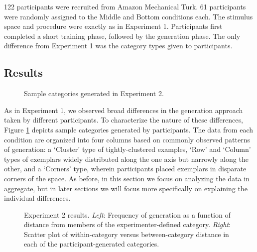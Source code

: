 \documentclass[12pt]{article}
\newcommand\inputpgf[2]{{
\let\pgfimageWithoutPath\pgfimage
\renewcommand{\pgfimage}[2][]{\pgfimageWithoutPath[##1]{#1/##2}}

}}
\begin{document}
\begin{flushleft}
122 participants were recruited from Amazon Mechanical Turk. 61 participants
were randomly assigned to the Middle and Bottom conditions each. The stimulus
space and procedure were exactly as in Experiment 1. Participants first
completed a short training phase, followed by the generation phase. The only
difference from Experiment 1 was the category types given to participants.


\subsection{Results}

\begin{figure}
    \begin{center} \inputpgf{figs/}{e2-samples.pgf}
    \caption{Sample categories generated in Experiment 2. }
    \label{fig:e2-samples}
    \end{center}
\end{figure}


As in Experiment 1, we observed broad differences in the generation approach
taken by different participants. To characterize the nature of these
differences, Figure \ref{fig:e2-samples} depicts sample categories generated by
participants. The data from each condition are organized into four columns based
on commonly observed patterns of generation: a `Cluster' type of
tightly-clustered examples, `Row' and `Column' types of exemplars widely
distributed along the one axis but narrowly along the other, and a `Corners'
type, wherein participants placed exemplars in disparate corners of the space.
As before, in this section we focus on analyzing the data in aggregate, but in
later sections we will focus more specifically on explaining the individual
differences.

\begin{figure}
    \begin{center} \inputpgf{figs/}{e2-distanceplots.pgf}
    \caption{Experiment 2 results. {\em Left}: Frequency of generation as a
function of distance from members of the experimenter-defined category. {\em
Right}: Scatter plot of within-category versus between-category distance in each
of the participant-generated categories.}
    \label{fig:e2-distanceplots}
    \end{center}
\end{figure}


\end{flushleft}
\end{document}
